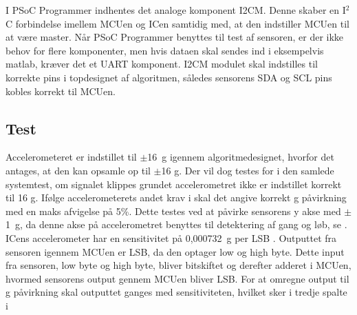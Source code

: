 I PSoC Programmer indhentes det analoge komponent I2CM. Denne skaber en I$^2$C forbindelse imellem MCUen og ICen samtidig med, at den indstiller MCUen til at være master. Når PSoC Programmer benyttes til test af sensoren, er der ikke behov for flere komponenter, men hvis dataen skal sendes ind i eksempelvis matlab, kræver det et UART komponent. 
I2CM modulet skal indstilles til korrekte pins i topdesignet af algoritmen, således sensorens SDA og SCL pins kobles korrekt til MCUen.

\subsection{Test}
Accelerometeret er indstillet til $\pm$16~g igennem algoritmedesignet, hvorfor det antages, at den kan opsamle op til $\pm$16 g. Der vil dog testes for i den samlede systemtest, om signalet klippes grundet accelerometret ikke er indstillet korrekt til 16 g. Ifølge accelerometerets andet krav i  skal det angive korrekt g påvirkning med en maks afvigelse på 5\%. Dette testes ved at påvirke sensorens y akse med $\pm$1~g, da denne akse på accelerometret benyttes til detektering af gang og løb, se .\\

ICens accelerometer har en sensitivitet på 0,000732~g per LSB \citep{STMicroelectronics2016}. Outputtet fra sensoren igennem MCUen er LSB, da den optager low og high byte. Dette input fra sensoren, low byte og high byte, bliver bitskiftet og derefter adderet i MCUen, hvormed sensorens output gennem MCUen bliver LSB. For at omregne output til g påvirkning skal outputtet ganges med sensitiviteten, hvilket sker i tredje spalte i 

